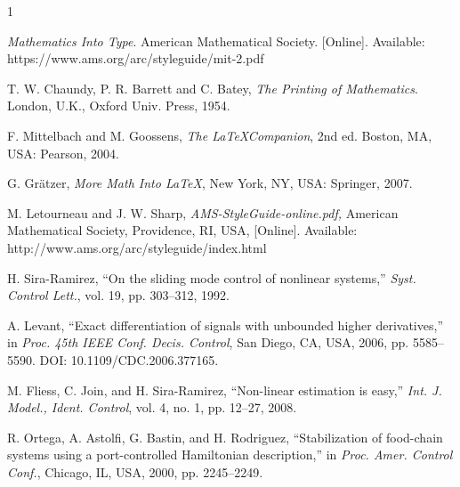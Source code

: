 \documentclass[lettersize,journal]{IEEEtran}
\begin{document}
\begin{thebibliography}{1}


{\it{Mathematics Into Type}}. American Mathematical Society. [Online]. Available: https://www.ams.org/arc/styleguide/mit-2.pdf

T. W. Chaundy, P. R. Barrett and C. Batey, {\it{The Printing of Mathematics}}. London, U.K., Oxford Univ. Press, 1954.

F. Mittelbach and M. Goossens, {\it{The \LaTeX Companion}}, 2nd ed. Boston, MA, USA: Pearson, 2004.

G. Gr\"atzer, {\it{More Math Into LaTeX}}, New York, NY, USA: Springer, 2007.

M. Letourneau and J. W. Sharp, {\it{AMS-StyleGuide-online.pdf,}} American Mathematical Society, Providence, RI, USA, [Online]. Available: http://www.ams.org/arc/styleguide/index.html

H. Sira-Ramirez, ``On the sliding mode control of nonlinear systems,'' \textit{Syst. Control Lett.}, vol. 19, pp. 303--312, 1992.

A. Levant, ``Exact differentiation of signals with unbounded higher derivatives,''  in \textit{Proc. 45th IEEE Conf. Decis.
Control}, San Diego, CA, USA, 2006, pp. 5585--5590. DOI: 10.1109/CDC.2006.377165.

M. Fliess, C. Join, and H. Sira-Ramirez, ``Non-linear estimation is easy,'' \textit{Int. J. Model., Ident. Control}, vol. 4, no. 1, pp. 12--27, 2008.

R. Ortega, A. Astolfi, G. Bastin, and H. Rodriguez, ``Stabilization of food-chain systems using a port-controlled Hamiltonian description,'' in \textit{Proc. Amer. Control Conf.}, Chicago, IL, USA,
2000, pp. 2245--2249.

\end{thebibliography}


\newpage

 
\end{document}
